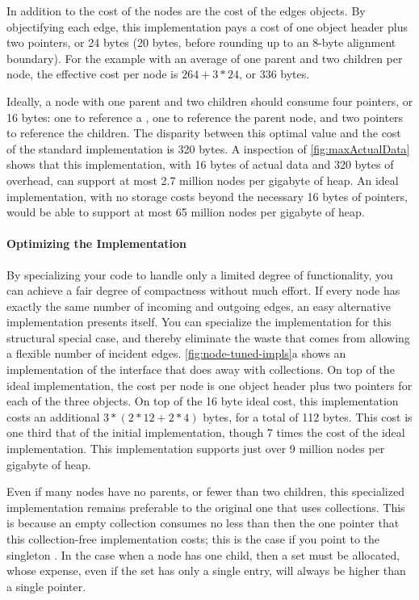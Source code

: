 In addition to the cost of the nodes are the cost of the edges objects. By
objectifying each edge, this implementation pays a cost of one object header
plus two pointers, or 24 bytes (20 bytes, before rounding up to an 8-byte
alignment boundary). For the example with an average of one parent and two
children per node, the effective cost per node is $264 + 3*24$, or $336$ bytes.

Ideally, a node with one parent and two children should consume four pointers, or
16 bytes: one to reference a , one to reference the parent node, and
two pointers to reference the children. The disparity between this optimal value
and the cost of the standard implementation is 320 bytes. A inspection of
\autoref{fig:maxActualData} shows that this implementation, with 16 bytes of
actual data and 320 bytes of overhead, can support at most 2.7 million nodes per
gigabyte of heap. An ideal implementation, with no storage costs beyond the
necessary 16 bytes of pointers, would be able to support at most 65 million nodes
per gigabyte of heap.

\paragraph{Optimizing the Implementation}
By specializing your code to handle only a limited degree of functionality, you
can achieve a fair degree of compactness without much effort. If every node has
exactly the same number of incoming and outgoing edges, an easy alternative
implementation presents itself. You can specialize the implementation for this
structural special case, and thereby eliminate the waste that comes from allowing
a flexible number of incident edges.
\autoref{fig:node-tuned-impls}a shows an implementation of the 
interface that does away with collections. On top of the ideal implementation,
the cost per node is one object header plus two pointers for each of the three
 objects. On top of the 16 byte ideal cost, this implementation costs
an additional $3*(2*12 + 2*4)$ bytes, for a total of 112 bytes. This cost is one
third that of the initial implementation, though 7 times the cost of the ideal
implementation. This implementation supports just over 9 million nodes per
gigabyte of heap.

Even if many nodes have no parents, or fewer than two children, this specialized
implementation remains preferable to the original one that uses collections. This
is because an empty collection consumes no less than then the one pointer that
this collection-free implementation costs; this is the case if you point to the
singleton . In the case when a node has one child,
then a set must be allocated, whose expense, even if the set has only a single
entry, will always be higher than a single pointer.

